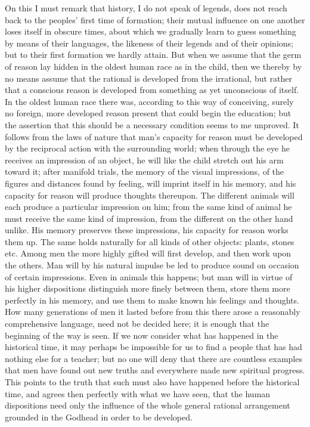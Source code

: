 \documentclass[12pt,a4paper,openany]{book}
\newcommand{\opage}[1]{\marginnote{\footnotesize\textit{[#1]}}}
\begin{document}
On this I must remark that history, I do not speak of legends, does not reach back
to the peoples' first time of formation; their mutual influence on one another loses
itself in obscure times, about which we gradually learn to guess something by means
of their languages, the likeness of their legends and of their opinions; but to
their first formation we hardly attain. But when we assume that the germ of reason
lay hidden in the oldest human race as in the child, then we thereby by no means
assume that the rational is developed from the irrational, but rather that a
conscious reason is developed from something as yet unconscious of itself. In the
oldest human race there was, according to this way of conceiving, surely no foreign,
more developed reason present that could begin the education; but the assertion that
this should be a necessary condition seems to me unproved. It follows from the laws
of nature that man's capacity for reason must be developed by the reciprocal action
with the surrounding world; when through the eye he receives an impression of an
object, he will like the child stretch out his arm toward it; after manifold trials,
the memory of the visual impressions, of the figures and distances found by feeling,
will imprint itself in his memory, and his capacity for reason will produce thoughts
thereupon. The different animals will each produce a particular impression on him;
from the same kind of animal he must receive the same kind of impression, from the
different on the other hand unlike. His memory preserves these impressions, his
capacity for reason works them up. The same holds naturally for all kinds of
\setcounter{footnote}{0}%
\opage{79}other objects: plants, stones etc. Among men the more highly gifted will first
develop, and then work upon the others. Man will by his natural impulse be led to
produce sound on occasion of certain impressions. Even in animals this happens; but
man will in virtue of his higher dispositions distinguish more finely between them,
store them more perfectly in his memory, and use them to make known his feelings and
thoughts. How many generations of men it lasted before from this there arose a
reasonably comprehensive language, need not be decided here; it is enough that the
beginning of the way is seen. If we now consider what has happened in the historical
time, it may perhaps be impossible for us to find a people that has had nothing else
for a teacher; but no one will deny that there are countless examples that men have
found out new truths and everywhere made new spiritual progress. This points to the
truth that such must also have happened before the historical time, and agrees then
perfectly with what we have seen, that the human dispositions need only the
influence of the whole general rational arrangement grounded in the Godhead in order
to be developed.
\end{document}

